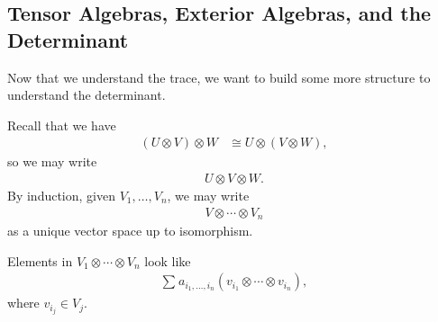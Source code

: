 \documentclass[10pt]{mypackage}
\begin{document}
  \subsection{Tensor Algebras, Exterior Algebras, and the Determinant}%
  Now that we understand the trace, we want to build some more structure to understand the determinant.\newline


    Recall that we have
    \begin{align*}
      \left(U\otimes V\right) \otimes W &\cong U\otimes \left(V\otimes W\right),
    \end{align*}
    so we may write
    \begin{align*}
      U\otimes V \otimes W.
    \end{align*}
  By induction, given $V_1,\dots,V_n$, we may write
  \begin{align*}
    V\otimes \cdots \otimes V_n
  \end{align*}
  as a unique vector space up to isomorphism.\newline

  Elements in $V_1\otimes \cdots \otimes V_n$ look like
  \begin{align*}
    \sum_{}a_{i_1,\dots,i_{n}}\left(v_{i_1}\otimes\cdots\otimes v_{i_n}\right),
  \end{align*}
  where $v_{i_j}\in V_j$.\newline
\end{document}

